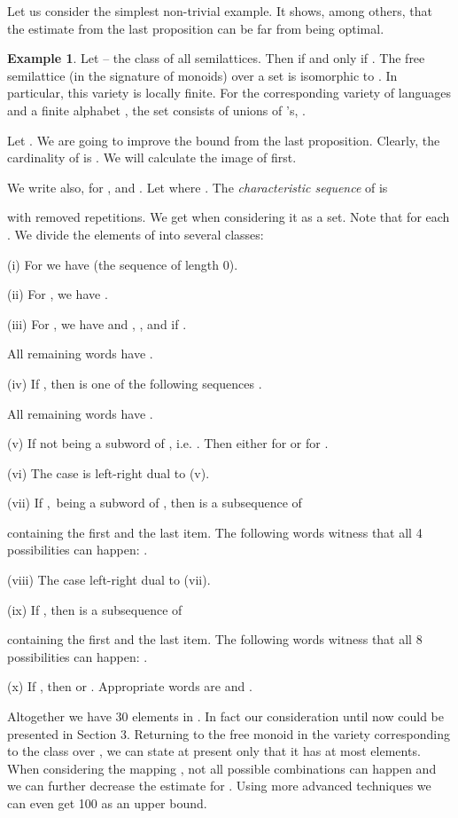 \documentclass[copyright]{eptcs}
\newcounter{theorem}
\theoremstyle{definition}
\newtheorem{example}[theorem]{Example}
\begin{document}
Let us consider the simplest non-trivial example.
It shows, among others, that the estimate from the last proposition can be  
far from being optimal.

\begin{example}
Let  -- the class of all semilattices.
Then  if and only if .
The free semilattice (in the signature of monoids)
over a set  is isomorphic to
. In particular, this variety is locally finite.
For the corresponding variety of languages 
and a finite alphabet , the set  consists of unions
of 's, .

Let .
We are going to improve
the bound  from the last proposition. 
Clearly, the cardinality of  is .
We will calculate the image of  first.

\def\c{\mathsf c}
\def\0{\emptyset}
\def\a{\{a\}} \def\b{\{b\}}
\def\ch{\mathsf{char}}
\def\h{\mathsf h} \def\t{\mathsf t}
We write also, for ,
 and
.
Let  where . 
The {\it characteristic sequence}  of  is

with removed repetitions. We get  when considering
it as a set. Note that
 for each .
We divide the elements of  into several classes:

(i) For  we have  (the sequence of length 0).

(ii) For , we have .

(iii) For , we have 
and , ,
and  if .

All remaining words have .

(iv) If , then
 is one of the following sequences
.
 
All remaining words have .

(v) If  not being a subword of , i.e.
. Then
either  for  or
 for .

(vi) The case   is left-right dual to (v).

(vii) If ,\  being a subword of , then
 is a subsequence of

containing the first and the last item. The following words
witness that all 4 possibilities can happen:
.

(viii)  The case left-right dual to (vii).

(ix) If , then  is a subsequence
of

containing the first and the last item. The following words
witness that all 8 possibilities can happen:
.

(x) If , then 
or   .
Appropriate words are  and .
\smallskip

Altogether we have 30 elements in . 
In fact our consideration until now could be presented in Section 3.
Returning to the free monoid in the variety corresponding to the class
 over , we can state at present only that it
has at most  elements. 
When considering the mapping
, not all possible  combinations can happen and we can
further decrease the estimate for . Using more advanced techniques
we can even get 100 as an upper bound.
\end{example}
\medskip
\end{document}

